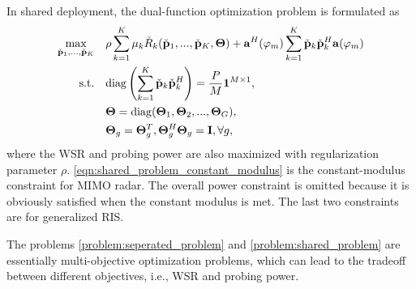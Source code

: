 In shared deployment, the dual-function optimization problem is formulated as
\begin{subequations}\label{problem:shared_problem}
    \begin{align}
      \label{eqn:shared_problem_obj} 
      \max_{\check{\bf p}_1,...,\check{\bf p}_K} \quad &\rho \sum_{k=1}^K \mu_k \check{R}_k(\check{\bf p}_1,...,\check{\bf p}_K,{\bf \Theta}) 
      + {\bf a}^H(\varphi_m) \sum_{k=1}^K \check{\bf p}_k \check{\bf p}_k^H {\bf a}(\varphi_m)\\
      \label{eqn:shared_problem_constant_modulus} 
      \mathrm{s.t.} \quad &\mathrm{diag}\left( \sum_{k=1}^K \check{\bf p}_k \check{\bf p}_k^H \right) = \frac{P}{M}{\bf 1}^{M \times 1}, \\
      \label{eqn:shared_problem_reflecting_1} 
      & {\bf \Theta} = \mathrm{diag}({\bf \Theta}_1, {\bf \Theta}_2,..., {\bf \Theta}_G), \\
      \label{eqn:shared_problem_reflecting_2} 
      & {\bf \Theta}_{g}={\bf \Theta}_{g}^T, {\bf \Theta}_g^H {\bf \Theta}_g = {\bf I}, \forall g, 
    \end{align}
\end{subequations}
where the WSR and probing power are also maximized with regularization parameter $\rho$. \eqref{eqn:shared_problem_constant_modulus} 
is the constant-modulus constraint for MIMO radar. The overall power constraint is omitted because it is obviously satisfied when 
the constant modulus is met. The last two constraints are for generalized RIS.

The problems \eqref{problem:seperated_problem} and \eqref{problem:shared_problem} are essentially multi-objective optimization problems,
which can lead to the tradeoff between different objectives, i.e., WSR and probing power.
